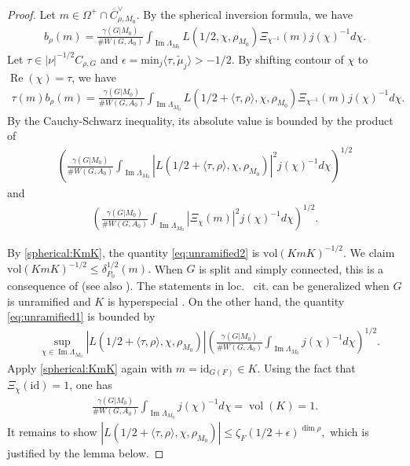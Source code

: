 \documentclass[10pt]{amsart}
\theoremstyle{definition}
\numberwithin{equation}{section}
\DeclareMathOperator{\vol}{\mathrm{vol}}
\numberwithin{equation}{subsection}
\renewcommand{\Im}{\mathop{\mathrm{Im}}}
\renewcommand{\Re}{\mathop{\mathrm{Re}}}
\begin{document}
\begin{proof} 
Let $m\in \Omega^+\cap \overline{C}_{\rho,M_0}^\lor.$ By  the spherical inversion formula, we have
\begin{align*}
    b_\rho(m) = \frac{\gamma(G|M_0)}{\# W(G,A_0)}\int_{\Im\Lambda_{M_0}} L(1/2,\chi,\rho_{M_0}) \Xi_{\chi^{-1}}(m)j(\chi)^{-1} d\chi.
\end{align*}
Let $\tau\in |\nu|^{-1/2}C_{\rho,G}$ and $\epsilon=\mathrm{min}_j \langle \tau, \widetilde{\mu}_j\rangle>-1/2.$ By shifting contour of $\chi$ to $\Re(\chi)=\tau$, we have
\begin{align*}
    \tau(m)b_\rho(m) = \frac{\gamma(G|M_0)}{\# W(G,A_0)}\int_{\Im\Lambda_{M_0}} L(1/2+\langle \tau,\rho\rangle,\chi,\rho_{M_0}) \Xi_{\chi^{-1}}(m)j(\chi)^{-1} d\chi.
\end{align*}
By the Cauchy-Schwarz inequality, its absolute value is bounded by the product of 
\begin{align}\label{eq:unramified1}
     \left(\frac{\gamma(G|M_0)}{\# W(G,A_0)}\int_{\Im\Lambda_{M_0}} |L(1/2+\langle \tau,\rho\rangle,\chi,\rho_{M_0}) |^2j(\chi)^{-1} d\chi\right)^{1/2}
\end{align}
and 
\begin{align}\label{eq:unramified2}
     \left(\frac{\gamma(G|M_0)}{\# W(G,A_0)}\int_{\Im\Lambda_{M_0}} |\Xi_{\chi}(m)|^2j(\chi)^{-1} d\chi\right)^{1/2}.
\end{align}

By \eqref{spherical:KmK}, the quantity \eqref{eq:unramified2} is $\mathrm{vol}(KmK)^{-1/2}$. We claim $\mathrm{vol}(KmK)^{-1/2}\le \delta_{P_0}^{1/2}(m).$  When $G$ is split and simply connected, this is a consequence of \cite[Proposition 3.2.15]{Macdonald:spherical} (see also \cite{Gross:Satake}). The statements in loc. ~cit. can be generalized when $G$ is unramified and $K$ is hyperspecial \cite[\S 1.6]{CasselmanCelyHales}. On the other hand, the quantity \eqref{eq:unramified1} is bounded by
\begin{align*}
   & \sup_{\chi\in \Im\Lambda_{M_0}} |L(1/2+\langle \tau,\rho\rangle,\chi,\rho_{M_0})|\left(\frac{\gamma(G|M_0)}{\# W(G,A_0)}\int_{\Im\Lambda_{M_0}} j(\chi)^{-1} d\chi\right)^{1/2}.
\end{align*}
Apply \eqref{spherical:KmK} again with $m=\mathrm{id}_{G(F)}\in K$. Using the fact that $\Xi_\chi(\mathrm{id}) =1$, one has
\begin{align*}
    \frac{\gamma(G|M_0)}{\# W(G,A_0)}\int_{\Im\Lambda_{M_0}} j(\chi)^{-1} d\chi=\vol(K) = 1.
\end{align*}
It remains to show $|L(1/2+\langle \tau,\rho\rangle,\chi,\rho_{M_0})|\le \zeta_F(1/2+\epsilon)^{\dim \rho},$ which is justified by the lemma below.
\end{proof}
\end{document}
